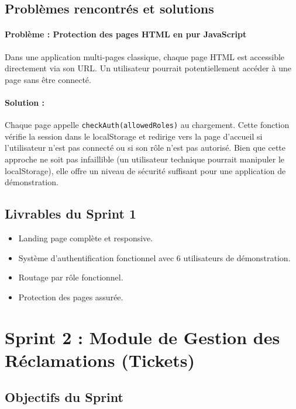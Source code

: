 \documentclass[12pt,a4paper,twoside]{report}
\begin{document}
\subsection{Problèmes rencontrés et solutions}

\paragraph{Problème : Protection des pages HTML en pur JavaScript}
Dans une application multi-pages classique, chaque page HTML est accessible directement via son URL. Un utilisateur pourrait potentiellement accéder à une page sans être connecté.

\paragraph{Solution :} Chaque page appelle \texttt{checkAuth(allowedRoles)} au chargement. Cette fonction vérifie la session dans le localStorage et redirige vers la page d'accueil si l'utilisateur n'est pas connecté ou si son rôle n'est pas autorisé. Bien que cette approche ne soit pas infaillible (un utilisateur technique pourrait manipuler le localStorage), elle offre un niveau de sécurité suffisant pour une application de démonstration.

\subsection{Livrables du Sprint 1}

\begin{itemize}
    \item Landing page complète et responsive.
    \item Système d'authentification fonctionnel avec 6 utilisateurs de démonstration.
    \item Routage par rôle fonctionnel.
    \item Protection des pages assurée.
\end{itemize}

\section{Sprint 2 : Module de Gestion des Réclamations (Tickets)}

\subsection{Objectifs du Sprint}
\end{document}
